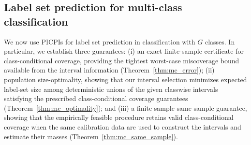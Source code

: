 \documentclass[11pt]{article}
\theoremstyle{statplain}
\theoremstyle{statdefinition}
\newcommand{\0}{\mathbf{0}}
\newcommand{\numClass}{G} %
\newcommand{\titleShorts}{PICPIs\xspace}
\begin{document}
\subsection{Label set prediction for multi-class classification}\label{sec:task_2}


We now use \titleShorts for label set prediction in classification with $\numClass$ classes. In particular, we establish three guarantees: (i) an exact finite-sample certificate for class-conditional coverage, providing the tightest worst-case miscoverage bound available from the interval information (Theorem~\ref{thm:mc_error}); (ii) population size-optimality, showing that our interval selection minimizes expected label-set size among deterministic unions of the
given classwise intervals satisfying the prescribed class-conditional coverage guarantees (Theorem~\ref{thm:mc_optimality}); and (iii) a finite-sample same-sample guarantee, showing that the empirically feasible procedure retains valid class-conditional coverage when the same calibration data are used to construct the intervals and estimate their masses (Theorem~\ref{thm:mc_same_sample}). 
\end{document}
